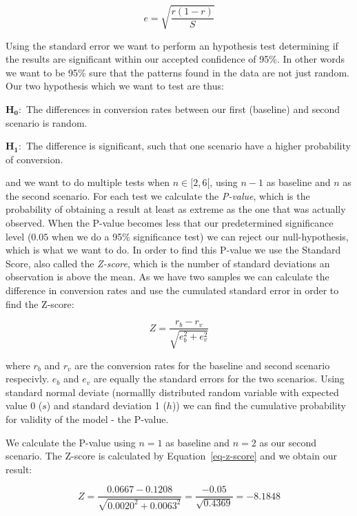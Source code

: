 \begin{equation}
  e = \sqrt{\frac{r(1 - r)}{S}}
\end{equation}

Using the standard error we want to perform an hypothesis test determining if
the results are significant within our accepted confidence of 95\%. In other
words we want to be 95\% sure that the patterns found in the data are not just
random. Our two hypothesis which we want to test are thus:

$\mathbf{H_0:}$ The differences in conversion rates between our first
(baseline) and second scenario is random.

$\mathbf{H_1:}$ The difference is significant, such that one scenario have a
higher probability of conversion.

and we want to do multiple tests when $n \in [2,6[$, using $n-1$ as baseline
and $n$ as the second scenario. For each test we calculate the
\textit{P-value}, which is the probability of obtaining a result at least as
extreme as the one that was actually observed. When the P-value becomes less
that our predetermined significance level ($0.05$ when we do a 95\%
significance test) we can reject our null-hypothesis, which is what we want to
do. In order to find this P-value we use the Standard Score, also called the
\textit{Z-score}, which is the number of standard deviations an observation is
above the mean. As we have two samples we can calculate the difference in
conversion rates and use the cumulated standard error in order to find the
Z-score:

\begin{equation}
  \label{eq-z-score}
  Z = \frac{r_b - r_v}{\sqrt{e_{b}^{2} + e_{v}^{2}}}
\end{equation}

where $r_b$ and $r_v$ are the conversion rates for the baseline and second
scenario respecivly. $e_b$ and $e_v$ are equally the standard errors for the
two scenarios. Using standard normal deviate (normallly distributed random
variable with expected value 0 ($s$) and standard deviation 1 ($h$)) we can
find the cumulative probability for validity of the model - the P-value.

We calculate the P-value using $n=1$ as baseline and $n=2$ as our second
scenario. The Z-score is calculated by Equation~\ref{eq-z-score} and we obtain
our result:

\begin{equation}
  Z = \frac{0.0667-0.1208}{\sqrt{0.0020^2 + 0.0063^2}} = \frac{-0.05}{\sqrt{0.4369}} = -8.1848
\end{equation}

